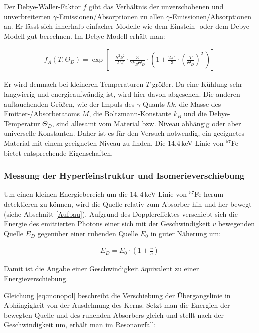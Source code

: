 \documentclass[
a4paper,                %
titlepage=firstiscover, %
captions=tableheading,  %
toc=bibliography,       %
toc=listof,             %
oneside,                %
automark,               %
12pt,                   %
english, ngerman,       %
parskip = half,         %
]{scrartcl}
\begin{document}
Der Debye-Waller-Faktor $f$ gibt das Verhältnis der unverschobenen und unverbreiterten $\gamma$-Emissionen/Absorptionen zu allen $\gamma$-Emissionen/Absorptionen an.
Er lässt sich innerhalb einfacher Modelle wie dem Einstein- oder dem Debye-Modell gut berechnen.
Im Debye-Modell erhält man:

\begin{align}
f_{A}(T,\Theta_{D})=\exp\left[ -\frac{\hbar^2k^2}{2M}\cdot\frac{3}{2k_B\Theta_D}\cdot\left( 1+\frac{2\pi^2}{3}\cdot\left( \frac{T}{\Theta_D}\right)^2\, \right) \right]
\end{align}

\noindent Er wird demnach bei kleineren Temperaturen $T$ größer.
Da eine Kühlung sehr langwierig und energieaufwändig ist, wird hier davon abgesehen.
Die anderen auftauchenden Größen, wie der Impuls des $\gamma$-Quants $\hbar k$, die Masse des Emitter-/Absorberatoms $M$, die Boltzmann-Konstante $k_B$ und die Debye-Temperatur $\Theta_D$, sind allesamt vom Material bzw. Niveau abhängig oder aber universelle Konstanten.
Daher ist es für den Versuch notwendig, ein geeignetes Material mit einem geeigneten Niveau zu finden.
Die 14,4\,keV-Linie von $^{57}$Fe bietet entsprechende Eigenschaften.


\subsubsection{Messung der Hyperfeinstruktur und Isomerieverschiebung} \label{Doppler}

Um einen kleinen Energiebereich um die $14,4\,$keV-Linie von $^{57}$Fe herum detektieren zu können, wird die Quelle relativ zum Absorber hin und her bewegt (siehe Abschnitt \ref{Aufbau}).
Aufgrund des Dopplereffektes verschiebt sich die Energie des emittierten Photons einer sich mit der Geschwindigkeit $v$ bewegenden Quelle $E_D$ gegenüber einer ruhenden Quelle $E_0$ in guter Näherung um:

\begin{align}
E_D=E_0\cdot\left( 1+\frac{v}{c}\right) 
\end{align}

\noindent Damit ist die Angabe einer Geschwindigkeit äquivalent zu einer Energieverschiebung.

Gleichung \ref{eq:monopol} beschreibt die Verschiebung der Übergangslinie in Abhängigkeit von der Ausdehnung des Kerns.
Setzt man die Energien der bewegten Quelle und des ruhenden Absorbers gleich und stellt nach der Geschwindigkeit um, erhält man im Resonanzfall:
\end{document}
